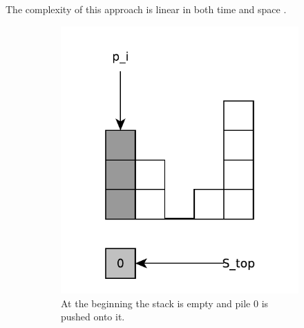 The complexity of this approach is linear in both time and space .



 


\begin{figure}
	\vspace{-0.4in}
	\centering
	\begin{subfigure}[t]{0.24\textwidth}
		\includegraphics[width=1\linewidth]{sources/trapping_water/images/stack_ex1}
		\caption{At the beginning the stack is empty and pile $0$ is pushed onto it.}
		\label{fig:trapping_water:stack_ex1}
	 \end{subfigure}
	\hfill
	\begin{subfigure}[t]{0.24\textwidth}

\end{subfigure}
\end{figure}
